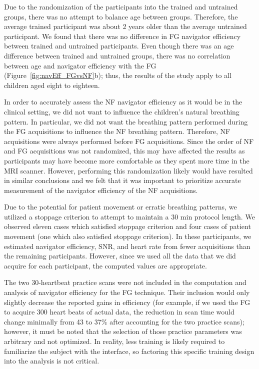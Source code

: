 		Due to the randomization of the participants into the trained and untrained groups, there was no attempt to balance age between groups. Therefore, the average trained participant was about 2 years older than the average untrained participant. We found that there was no difference in FG navigator efficiency between trained and untrained participants. Even though there was an age difference between trained and untrained groups, there was no correlation between age and navigator efficiency with the FG (Figure~\ref{fig:navEff_FGvsNF}b); thus, the results of the study apply to all children aged eight to eighteen.
		
		In order to accurately assess the NF navigator efficiency as it would be in the clinical setting, we did not want to influence the children's natural breathing pattern. In particular, we did not want the breathing pattern performed during the FG acquisitions to influence the NF breathing pattern. Therefore, NF acquisitions were always performed before FG acquisitions. Since the order of NF and FG acquisitions was not randomized, this may have affected the results as participants may have become more comfortable as they spent more time in the MRI scanner. However, performing this randomization likely would have resulted in similar conclusions and we felt that it was important to prioritize accurate measurement of the navigator efficiency of the NF acquisitions.
		
		Due to the potential for patient movement or erratic breathing patterns, we utilized a stoppage criterion to attempt to maintain a 30 min protocol length. We observed eleven cases which satisfied stoppage criterion and four cases of patient movement (one which also satisfied stoppage criterion). In these participants, we estimated navigator efficiency, SNR, and heart rate from fewer acquisitions than the remaining participants. However, since we used all the data that we did acquire for each participant, the computed values are appropriate.
		
		The two 30-heartbeat practice scans were not included in the computation and analysis of navigator efficiency for the FG technique. Their inclusion would only slightly decrease the reported gains in efficiency (for example, if we used the FG to acquire 300 heart beats of actual data, the reduction in scan time would change minimally from 43 to 37\% after accounting for the two practice scans); however, it must be noted that the selection of those practice parameters was arbitrary and not optimized. In reality, less training is likely required to familiarize the subject with the interface, so factoring this specific training design into the analysis is not critical.
		
